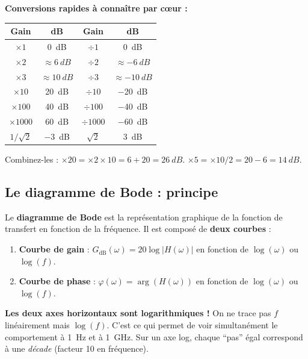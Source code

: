 \documentclass[12pt,a4paper,twoside]{book}
\begin{document}
\begin{pratique}
\textbf{Conversions rapides à connaître par c\oe ur :}
\begin{center}
\begin{tabular}{cc|cc}
\toprule
\textbf{Gain} & \textbf{dB} & \textbf{Gain} & \textbf{dB} \\
\midrule
$\times 1$ & \SI{0}{dB} & $\div 1$ & \SI{0}{dB} \\
$\times 2$ & $\approx \SI{+6}{dB}$ & $\div 2$ & $\approx \SI{-6}{dB}$ \\
$\times 3$ & $\approx \SI{+10}{dB}$ & $\div 3$ & $\approx \SI{-10}{dB}$ \\
$\times 10$ & \SI{+20}{dB} & $\div 10$ & \SI{-20}{dB} \\
$\times 100$ & \SI{+40}{dB} & $\div 100$ & \SI{-40}{dB} \\
$\times 1000$ & \SI{+60}{dB} & $\div 1000$ & \SI{-60}{dB} \\
$1/\sqrt{2}$ & \SI{-3}{dB} & $\sqrt{2}$ & \SI{+3}{dB} \\
\bottomrule
\end{tabular}
\end{center}
Combinez-les : $\times 20 = \times 2 \times 10 = 6 + 20 = \SI{+26}{dB}$. $\times 5 = \times 10 / 2 = 20 - 6 = \SI{+14}{dB}$.
\end{pratique}

\subsection{Le diagramme de Bode : principe}

Le \textbf{diagramme de Bode} est la représentation graphique de la fonction de transfert en fonction de la fréquence. Il est composé de \textbf{deux courbes} :

\begin{enumerate}[nosep]
\item \textbf{Courbe de gain} : $G_{\text{dB}}(\omega) = 20\log|H(\omega)|$ en fonction de $\log(\omega)$ ou $\log(f)$.
\item \textbf{Courbe de phase} : $\varphi(\omega) = \arg(H(\omega))$ en fonction de $\log(\omega)$ ou $\log(f)$.
\end{enumerate}

\begin{attention}
\textbf{Les deux axes horizontaux sont logarithmiques !} On ne trace pas $f$ linéairement mais $\log(f)$. C'est ce qui permet de voir simultanément le comportement à \SI{1}{Hz} et à \SI{1}{GHz}. Sur un axe log, chaque ``pas'' égal correspond à une \textit{décade} (facteur 10 en fréquence).
\end{attention}
\end{document}
